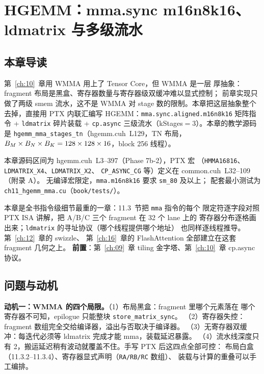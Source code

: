 \chapter{HGEMM：mma.sync m16n8k16、ldmatrix 与多级流水}\label{ch:11}

\section{本章导读}

第~\ref{ch:10}~章用 WMMA 用上了 Tensor Core，但 WMMA 是一层
厚抽象：fragment 布局是黑盒、寄存器数量与寄存器级双缓冲难以显式控制；
前章实现只做了两级 smem 流水，这不是 WMMA 对 stage 数的限制。本章把这层抽象整个去掉，直接用 PTX 内联汇编写
HGEMM：\texttt{mma.\allowbreak{}sync.\allowbreak{}aligned.\allowbreak{}m16n8k16} 矩阵指令 + \texttt{ldmatrix}
碎片装载 + \texttt{cp.async} 三级流水（kStages$=$3）。本章的教学源码是
\texttt{hgemm\_\allowbreak{}mma\_\allowbreak{}stages\_\allowbreak{}tn}（hgemm.cuh~L129，TN 布局，
$B\sb M\times B\sb N\times B\sb K = 128\times128\times16$，block 256 线程）。

本章源码区间为 hgemm.cuh~L3--397（Phase 7b-2），PTX 宏
（\texttt{HMMA16816}、\texttt{LDMATRIX\_X4}、\texttt{LDMATRIX\_X2}、
\texttt{CP\_ASYNC\_CG} 等）定义在 common.cuh~L32--109（附录 A）。
无编译宏限定，\texttt{mma.\allowbreak{}m16n8k16} 要求 \texttt{sm\_80} 及以上；
配套最小测试为 \texttt{ch11\_\allowbreak{}hgemm\_\allowbreak{}mma.\allowbreak{}cu}（\texttt{book/tests/}）。

本章是全书指令级细节最重的一章：11.3~节把 \texttt{mma} 指令的每个
限定符逐字段对照 PTX ISA 讲解，把 A/B/C 三个 fragment 在 32 个 lane 上的
寄存器分布逐格画出来；\texttt{ldmatrix} 的寻址协议（哪个线程提供哪个地址）
也同样逐线程推导。第~\ref{ch:12}~章的 swizzle、
第~\ref{ch:16}~章的 FlashAttention 全部建立在这套 fragment 几何之上。
\textbf{前置}：第~\ref{ch:09}~章 tiling 金字塔、第~\ref{ch:10}~章 cp.async 协议。

\section{问题与动机}

\textbf{动机一：WMMA 的四个局限。}（1）布局黑盒：fragment 里哪个元素落在
哪个寄存器不可知，epilogue 只能整块 \texttt{store\_\allowbreak{}matrix\_\allowbreak{}sync}。
（2）寄存器失控：fragment 数组完全交给编译器，溢出与否取决于编译器。
（3）无寄存器双缓冲：每迭代必须等 ldmatrix 完成才能 mma，装载延迟暴露。
（4）流水线深度只有 2，搬运延迟稍有波动就覆盖不住。手写 PTX 后这四点全部可控：
布局白盒（11.3.2--11.3.4）、寄存器显式声明（\texttt{RA/RB/RC} 数组）、
装载与计算的重叠可以手工编排。

